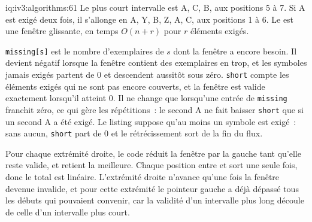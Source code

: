 \begin{solution}{iq:iv3:algorithms:61}
Le plus court intervalle est A, C, B, aux positions 5 à 7. Si A est exigé deux fois, il s'allonge en A, Y, B, Z, A, C, aux positions 1 à 6. Le  est une fenêtre glissante, en temps $O(n + r)$ pour $r$ éléments exigés.
\label{lst:iv3:al:minwindow}

\texttt{missing[s]} est le nombre d'exemplaires de $s$ dont la fenêtre a encore besoin. Il devient négatif lorsque la fenêtre contient des exemplaires en trop, et les symboles jamais exigés partent de 0 et descendent aussitôt sous zéro. \texttt{short} compte les éléments exigés qui ne sont pas encore couverts, et la fenêtre est valide exactement lorsqu'il atteint 0. Il ne change que lorsqu'une entrée de \texttt{missing} franchit zéro, ce qui gère les répétitions~: le second A ne fait baisser \texttt{short} que si un second A a été exigé. Le listing suppose qu'au moins un symbole est exigé~: sans aucun, \texttt{short} part de 0 et le rétrécissement sort de la fin du flux.

Pour chaque extrémité droite, le code réduit la fenêtre par la gauche tant qu'elle reste valide, et retient la meilleure. Chaque position entre et sort une seule fois, donc le total est linéaire. L'extrémité droite n'avance qu'une fois la fenêtre devenue invalide, et pour cette extrémité le pointeur gauche a déjà dépassé tous les débuts qui pouvaient convenir, car la validité d'un intervalle plus long découle de celle d'un intervalle plus court.

\end{solution}

